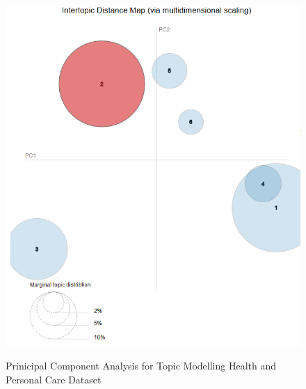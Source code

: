 

\begin{figure}[H]
  {\includegraphics[width = 0.85 \textwidth]{img/lda/2.PNG}}
  \caption{Prinicipal Component Analysis for Topic Modelling Health and Personal Care Dataset}
\end{figure}



